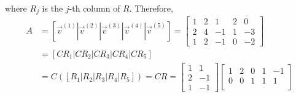 where $R_j$ is the $j$-th column of $R$. Therefore, 
\begin{align*}
A &= [\vec{v}^{(1)}|\vec{v}^{(2)}|\vec{v}^{(3)}|\vec{v}^{(4)}|\vec{v}^{(5)}] 
= \begin{bmatrix}
1 & 2 & 1 & 2 & 0 \\
2 & 4 & -1 & 1 & -3\\
1 & 2 & -1 & 0 & -2
\end{bmatrix} \\
&= [CR_1|CR_2|CR_3|CR_4|CR_5] \\
&= C([R_1|R_2|R_3|R_4|R_5]) = CR = \begin{bmatrix}
1 & 1 \\
2 & -1 \\
1 & -1
\end{bmatrix}\begin{bmatrix}
1 & 2 & 0 & 1 & -1 \\
0 & 0 & 1 & 1 & 1 \\
\end{bmatrix}
\end{align*}
